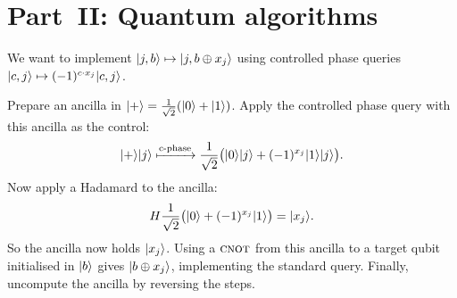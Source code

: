 \documentclass[12pt,oneside]{amsart}
\begin{document}
\section*{Part~II: Quantum algorithms}
\setcounter{section}{2}
\setcounter{exercise}{0}

\begin{exercise}
\end{exercise}
\begin{solution}
  We want to implement $|j,b\rangle\mapsto|j,b\oplus x_j\rangle$ using
  controlled phase queries $|c,j\rangle\mapsto(-1)^{c\cdot x_j}|c,j\rangle$.

  Prepare an ancilla in $|+\rangle=\frac{1}{\sqrt{2}}(|0\rangle+|1\rangle)$.
  Apply the controlled phase query with this ancilla as the control:
  \[
    |+\rangle|j\rangle \xmapsto{\text{c-phase}}
    \frac{1}{\sqrt{2}}\bigl(|0\rangle|j\rangle + (-1)^{x_j}|1\rangle|j\rangle\bigr).
  \]
  Now apply a Hadamard to the ancilla:
  \[
    H\frac{1}{\sqrt{2}}\bigl(|0\rangle+(-1)^{x_j}|1\rangle\bigr)
    = |x_j\rangle.
  \]
  So the ancilla now holds $|x_j\rangle$.  Using a $\textsc{cnot}$ from this ancilla
  to a target qubit initialised in $|b\rangle$ gives $|b\oplus x_j\rangle$,
  implementing the standard query. Finally, uncompute the ancilla by
  reversing the steps.
\end{solution}
\end{document}
